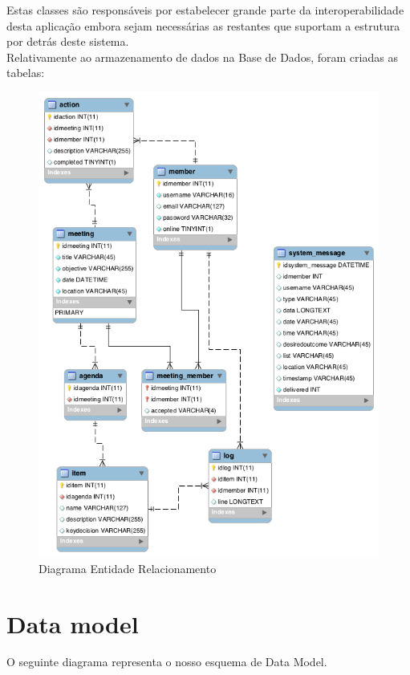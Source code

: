\documentclass[12pt]{article} %
\begin{document}
Estas classes são responsáveis por estabelecer grande parte da interoperabilidade desta aplicação embora sejam necessárias as restantes que suportam a estrutura por detrás deste sistema.\\ 


Relativamente ao armazenamento de dados na Base de Dados, foram criadas as tabelas:

\begin{figure}[!ht]
  	\centering
  	\includegraphics[scale=0.5]{ERdiagram.png}
  	\caption{Diagrama Entidade Relacionamento}
	\label{figure3}
\end{figure}

\-
\pagebreak


\section{Data model} %
\label{sec:data}
O seguinte diagrama representa o nosso esquema de Data Model.
\end{document}
